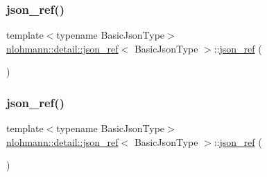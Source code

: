 \mbox{\label{classnlohmann_1_1detail_1_1json__ref_a59221ddbd756ca24d289c787fab38dbc}} 
\subsubsection{\texorpdfstring{json\+\_\+ref()}{json\_ref()}\hspace{0.1cm}{\footnotesize\ttfamily [5/6]}}
{\footnotesize\ttfamily template$<$typename Basic\+Json\+Type$>$ \\
\hyperlink{classnlohmann_1_1detail_1_1json__ref}{nlohmann\+::detail\+::json\+\_\+ref}$<$ Basic\+Json\+Type $>$\+::\hyperlink{classnlohmann_1_1detail_1_1json__ref}{json\+\_\+ref} (\begin{DoxyParamCaption}\item[{\hyperlink{classnlohmann_1_1detail_1_1json__ref}{json\+\_\+ref}$<$ Basic\+Json\+Type $>$ \&\&}]{ }\end{DoxyParamCaption})\hspace{0.3cm}{\ttfamily [default]}}

\mbox{\label{classnlohmann_1_1detail_1_1json__ref_a4c68db46934e03588bbd73b00147c0dd}} 
\subsubsection{\texorpdfstring{json\+\_\+ref()}{json\_ref()}\hspace{0.1cm}{\footnotesize\ttfamily [6/6]}}
{\footnotesize\ttfamily template$<$typename Basic\+Json\+Type$>$ \\
\hyperlink{classnlohmann_1_1detail_1_1json__ref}{nlohmann\+::detail\+::json\+\_\+ref}$<$ Basic\+Json\+Type $>$\+::\hyperlink{classnlohmann_1_1detail_1_1json__ref}{json\+\_\+ref} (\begin{DoxyParamCaption}\item[{const \hyperlink{classnlohmann_1_1detail_1_1json__ref}{json\+\_\+ref}$<$ Basic\+Json\+Type $>$ \&}]{ }\end{DoxyParamCaption})\hspace{0.3cm}{\ttfamily [delete]}}

